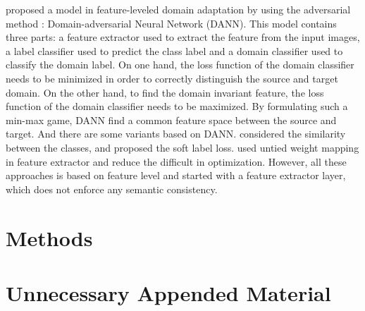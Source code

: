 \documentclass{kththesis}
\begin{document}
\cite{ganin2015unsupervised,ganin2016domain} proposed a model in feature-leveled domain adaptation by using the adversarial method \cite{goodfellow2014generative}: Domain-adversarial Neural Network (DANN). This model contains three parts: a feature extractor used to extract the feature from the input images, a label classifier used to predict the class label and a domain classifier used to classify the domain label. On one hand, the loss function of the domain classifier needs to be minimized in order to correctly distinguish the source and target domain. On the other hand, to find the domain invariant feature, the loss function of the domain classifier needs to be maximized. By formulating such a min-max game, DANN find a common feature space between the source and target. And there are some variants based on DANN. \cite{tzeng2015simultaneous} considered the similarity between the classes, and proposed the soft label loss. \cite{tzeng2017adversarial} used untied weight mapping in feature extractor and reduce the difficult in optimization. However, all these approaches is based on feature level and started with a feature extractor layer, which does not enforce any semantic consistency\cite{hoffman2017cycada}. 



\chapter{Methods}

\blindtext

\printbibliography[heading=bibintoc] %

\appendix

\chapter{Unnecessary Appended Material}
\end{document}
